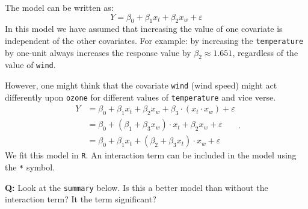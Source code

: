 \documentclass[10pt,ignorenonframetext,]{beamer}
\begin{document}
\begin{frame}[fragile]

The model can be written as:
\[Y = \beta_0 + \beta_1 x_t + \beta_2 x_w + \varepsilon\] In this model
we have assumed that increasing the value of one covariate is
independent of the other covariates. For example: by increasing the
\texttt{temperature} by one-unit always increases the response value by
\(\beta_2 \approx 1.651\), regardless of the value of \texttt{wind}.

\end{frame}

\begin{frame}[fragile]

However, one might think that the covariate \texttt{wind} (wind speed)
might act differently upon \texttt{ozone} for different values of
\texttt{temperature} and vice verse.
\[\begin{aligned} Y &= \beta_0 +  \beta_1 x_t + \beta_2 x_w + \beta_3\cdot(x_t  \cdot x_w) +\varepsilon \\ &= \beta_0 +  (\beta_1 + \beta_3 x_w) \cdot x_t + \beta_2 x_w + \varepsilon \\ &= \beta_0 + \beta_1 x_t + (\beta_2 + \beta_3 x_t) \cdot x_w + \varepsilon \end{aligned}.\]
We fit this model in \texttt{R}. An interaction term can be included in
the model using the \texttt{*} symbol.

\textbf{Q:} Look at the \texttt{summary} below. Is this a better model
than without the interaction term? It the term significant?

\end{frame}
\end{document}
